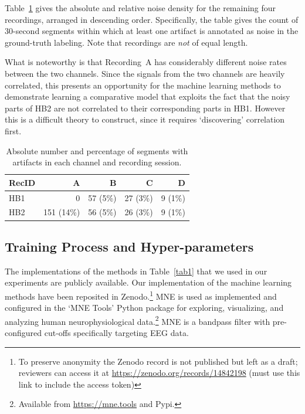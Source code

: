 \documentclass[runningheads]{llncs}
\begin{document}
Table~\ref{tab2} gives the absolute and relative noise density for the
remaining four recordings, arranged in descending order.
Specifically, the table gives the count of 30-second segments within
which at least one artifact is annotated as noise in the ground-truth
labeling. Note that recordings are \emph{not} of equal length.

What is noteworthy is that Recording~A has considerably different
noise rates between the two channels. Since the signals from the
two channels are heavily correlated, this presents an opportunity
for the machine learning methods to demonstrate learning a
comparative model that exploits the fact that the noisy parts of
HB2 are not correlated to their corresponding parts in HB1. However
this is a difficult theory to construct, since it requires
`discovering' correlation first.


\begin{table}[bt]
\caption{Absolute number and percentage of segments with artifacts in
  each channel and recording session.}
\centering
\renewcommand{\arraystretch}{1.3} %
\begin{tabular}{lrrrr}
\toprule
RecID &  A         &  B       &  C & D \\
\midrule
HB1   &   0        & 57 (5\%) & 27 (3\%) & 9 (1\%) \\

HB2   & 151 (14\%) & 56 (5\%) & 26 (3\%) & 9 (1\%) \\
\bottomrule
\end{tabular}
\label{tab2}
\end{table}



\subsection{Training Process and Hyper-parameters}

The implementations of the methods in Table~\ref{tab1} that we used in
our experiments are publicly available. Our implementation of the
machine learning methods have been reposited in Zenodo.\footnote{To preserve
  anonymity the Zenodo record is not published but left as a draft;
  reviewers can access it at
  \href{https://zenodo.org/records/14842198?preview=1&token=eyJhbGciOiJIUzUxMiJ9.eyJpZCI6IjNjMWE3YTg3LTM4MzgtNGNlMC1hNDE4LTJjMWJlMjU5YjA3NyIsImRhdGEiOnt9LCJyYW5kb20iOiJiODVmNmVhMDE1NjczMThjNjI2MTI1ODQyZTExOWIxMiJ9.o4gCR2U_bkKruC97ZdexHkU7iVI2q28Cx_0tD8xkPjGyjoPdWNqsASLj62O0hhfdoFxliJFKKrQdrAWVoeLcXw}{https://zenodo.org/records/14842198} (must use this link to include the access token)}
MNE is used as implemented and configured in the `MNE Tools' Python
package for exploring, visualizing, and analyzing human
neurophysiological data.\footnote{Available from \url{https://mne.tools} and Pypi.}
MNE is a bandpass filter with pre-configured cut-offs specifically
targeting EEG data.
\end{document}
